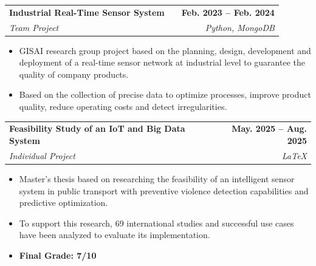\documentclass[a4paper,10pt]{article}
\makeatletter
\newcommand{\smallblacksquare}{\raisebox{0.4ex}{\rule{0.6ex}{0.6ex}}}
\newenvironment{projectlong}[4]
{
	\begin{tabularx}{\linewidth}{@{}l X r@{}}
		\textbf{#1} & \hfill & \textbf{#2} \\
		\small\textit{#3} & \hfill & \small\textit{#4} \\[3.75pt]
	\end{tabularx}
	\begin{minipage}[t]{\linewidth}
		\begin{itemize}[nosep,after=\strut, leftmargin=1em, itemsep=3pt,label=\smallblacksquare]
		}
		{
		\end{itemize}
	\end{minipage}    
}
\newenvironment{publicationlong}[4]
{
	\begin{tabularx}{\linewidth}{@{}l X r@{}}
		\textbf{#1} & \hfill & \textbf{#2} \\
		\small\textit{#3} & \hfill & \small\textit{#4} \\[3.75pt]
	\end{tabularx}
	\begin{minipage}[t]{\linewidth}
		\begin{itemize}[nosep,after=\strut, leftmargin=1em, itemsep=3pt,label=\smallblacksquare]
		}
		{
		\end{itemize}
	\end{minipage}    
}
\makeatother
\begin{document}
	\clearpage
	
	\begin{projectlong}{Industrial Real-Time Sensor System}{Feb. 2023 – Feb. 2024}{Team Project}{Python, MongoDB}
		\item GISAI research group project based on the planning, design, development and deployment of a real-time sensor network at industrial level to guarantee the quality of company products.
		\item Based on the collection of precise data to optimize processes, improve product quality, reduce operating costs and detect irregularities.
	\end{projectlong}
	
	\begin{projectlong}{Feasibility Study of an IoT and Big Data System}{May. 2025 – Aug. 2025}{Individual Project}{LaTeX}
		\item Master's thesis based on researching the feasibility of an intelligent sensor system in public transport with preventive violence detection capabilities and predictive optimization.
		\item To support this research, 69 international studies and successful use cases have been analyzed to evaluate its implementation.
		\item \textbf{Final Grade: 7/10}
	\end{projectlong}
	
	
\end{document}
